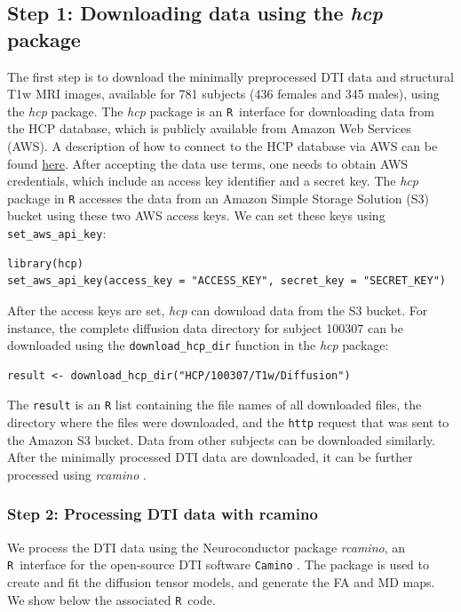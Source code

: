 \documentclass[]{elsarticle} %
\newcommand{\code}[1]{\texttt{#1}}
\newcommand{\pkg}[1]{\emph{#1}}
\newcommand{\rlang}{\texttt{R}}
\begin{document}
\subsection{Step 1: Downloading data using the \pkg{hcp} package}
The first step is to download the minimally preprocessed DTI data \citep{hcpminimal} and structural T1w MRI images, available  for 781 subjects (436 females and 345 males), using the \pkg{hcp} \citep{hcp} package.  The \pkg{hcp} package is an \rlang~interface for downloading data from the HCP database, which is publicly available from Amazon Web Services (AWS). A description of how to connect to the HCP database via AWS can be found \href{https://wiki.humanconnectome.org/display/PublicData/How+To+Connect+to+Connectome+Data+via+AWS}{here}.  After accepting the data use terms, one needs to obtain AWS credentials, which include an access key identifier and a secret  key. The \pkg{hcp} package in {\rlang} accesses the data from an Amazon Simple Storage Solution (S3) bucket using these two AWS access keys.  We can set these keys using \code{set\_aws\_api\_key}:
\color{blue}
\begin{verbatim}
library(hcp)
set_aws_api_key(access_key = "ACCESS_KEY", secret_key = "SECRET_KEY")
\end{verbatim}
\color{black}
After the access keys are set, \pkg{hcp} can download data from the S3 bucket.  For instance, the complete diffusion data directory for subject 100307 can be downloaded using the \code{download\_hcp\_dir} function in the \pkg{hcp} package:
\color{blue}
\begin{verbatim}
result <- download_hcp_dir("HCP/100307/T1w/Diffusion")
\end{verbatim}
\color{black}
The \code{result} is an {\rlang} list containing the file names of all downloaded files, the directory where the files were downloaded, and the \texttt{http} request that was sent to the Amazon S3 bucket. Data from other subjects can be downloaded similarly. After the minimally processed DTI data are downloaded, it can be further processed using \pkg{rcamino} \cite{rcamino}.

\subsubsection{Step 2: Processing DTI data with rcamino}

We process the DTI data using the Neuroconductor package \pkg{rcamino}, an \rlang~interface for the open-source DTI software \texttt{Camino} \citep{camino}. The package is used to create and fit the diffusion tensor models, and generate the FA and MD maps. We show below the associated \rlang~code. 
\end{document}
